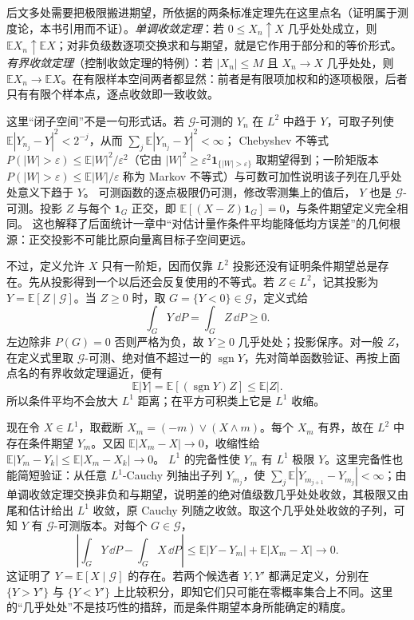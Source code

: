 后文多处需要把极限搬进期望，所依据的两条标准定理先在这里点名（证明属于测度论，本书引用而不证）。\emph{单调收敛定理}：若 \(0\le X_n\uparrow X\) 几乎处处成立，则 \(\mathbb EX_n\uparrow\mathbb EX\)；对非负级数逐项交换求和与期望，就是它作用于部分和的等价形式。\emph{有界收敛定理}（控制收敛定理的特例）：若 \(|X_n|\le M\) 且 \(X_n\to X\) 几乎处处，则 \(\mathbb EX_n\to\mathbb EX\)。在有限样本空间两者都显然：前者是有限项加权和的逐项极限，后者只有有限个样本点，逐点收敛即一致收敛。

这里“闭子空间”不是一句形式话。若 \(\mathcal G\)-可测的
\(Y_n\) 在 \(L^2\) 中趋于 \(Y\)，可取子列使
\(\mathbb E|Y_{n_j}-Y|^2<2^{-j}\)，从而
\(\sum_j\mathbb E|Y_{n_j}-Y|^2<\infty\)；
Chebyshev 不等式 \(P(|W|>\varepsilon)\le\mathbb E|W|^2/\varepsilon^2\)（它由 \(|W|^2\ge\varepsilon^2\mathbf1_{\{|W|>\varepsilon\}}\) 取期望得到；一阶矩版本
\(P(|W|>\varepsilon)\le\mathbb E|W|/\varepsilon\) 称为
Markov 不等式）与可数可加性说明该子列在几乎处处意义下趋于 \(Y\)。
可测函数的逐点极限仍可测，修改零测集上的值后，
\(Y\) 也是 \(\mathcal G\)-可测。投影 \(Z\) 与每个
\(\mathbf1_G\) 正交，即
\(\mathbb E[(X-Z)\mathbf1_G]=0\)，与条件期望定义完全相同。
这也解释了后面统计一章中“对估计量作条件平均能降低均方误差”的几何根源：正交投影不可能比原向量离目标子空间更远。

不过，定义允许 \(X\) 只有一阶矩，因而仅靠 \(L^2\) 投影还没有证明条件期望总是存在。先从投影得到一个以后还会反复使用的不等式。若 \(Z\in L^2\)，记其投影为 \(Y=\mathbb E[Z\mid\mathcal G]\)。当 \(Z\ge0\) 时，取 \(G=\{Y<0\}\in\mathcal G\)，定义式给
\[
\int_GY\,\dd P=\int_GZ\,\dd P\ge0.
\]
左边除非 \(P(G)=0\) 否则严格为负，故 \(Y\ge0\) 几乎处处；投影保序。对一般 \(Z\)，在定义式里取 \(\mathcal G\)-可测、绝对值不超过一的 \(\operatorname{sgn}Y\)，先对简单函数验证、再按上面点名的有界收敛定理逼近，便有
\[
\mathbb E|Y|=\mathbb E[(\operatorname{sgn}Y)Z]
\le\mathbb E|Z|.
\]
所以条件平均不会放大 \(L^1\) 距离；在平方可积类上它是 \(L^1\) 收缩。

现在令 \(X\in L^1\)，取截断
\(X_m=(-m)\vee(X\wedge m)\)。每个 \(X_m\) 有界，故在 \(L^2\) 中存在条件期望 \(Y_m\)。又因
\(\mathbb E|X_m-X|\to0\)，收缩性给
\(\mathbb E|Y_m-Y_k|\le\mathbb E|X_m-X_k|\to0\)。
\(L^1\) 的完备性使 \(Y_m\) 有 \(L^1\) 极限 \(Y\)。这里完备性也能简短验证：从任意 \(L^1\)-Cauchy 列抽出子列 \(Y_{m_j}\)，使 \(\sum_j\mathbb E|Y_{m_{j+1}}-Y_{m_j}|<\infty\)；由单调收敛定理交换非负和与期望，说明差的绝对值级数几乎处处收敛，其极限又由尾和估计给出 \(L^1\) 收敛，原 Cauchy 列随之收敛。取这个几乎处处收敛的子列，可知 \(Y\) 有 \(\mathcal G\)-可测版本。对每个 \(G\in\mathcal G\)，
\[
\left|\int_GY\,\dd P-\int_GX\,\dd P\right|
\le\mathbb E|Y-Y_m|+\mathbb E|X_m-X|\longrightarrow0.
\]
这证明了 \(Y=\mathbb E[X\mid\mathcal G]\) 的存在。若两个候选者 \(Y,Y'\) 都满足定义，分别在
\(\{Y>Y'\}\) 与 \(\{Y<Y'\}\) 上比较积分，即知它们只可能在零概率集合上不同。这里的“几乎处处”不是技巧性的措辞，而是条件期望本身所能确定的精度。

